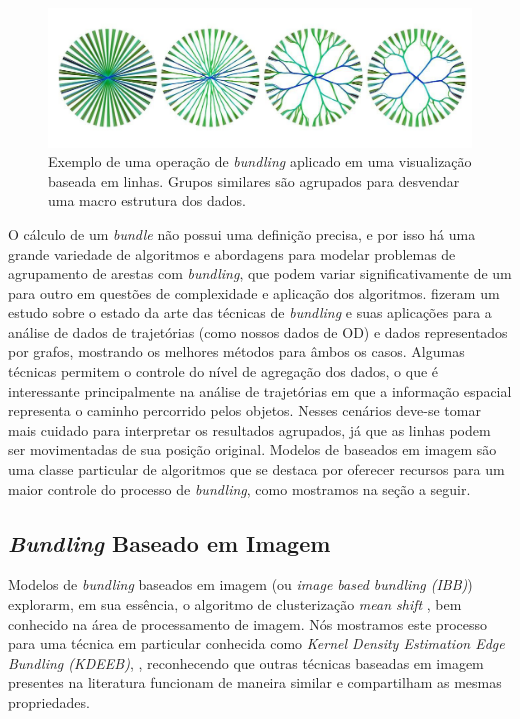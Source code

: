 \begin{figure}[!htb]
  \centering
  \includegraphics[width=1\textwidth]{../figuras/bundling.jpeg}
  \caption[Exemplo de uma operação de \emph{bundling} aplicado em uma visualização baseada em linhas]{
  Exemplo de uma operação de \emph{bundling} aplicado em uma visualização baseada em linhas. Grupos similares
  são agrupados para desvendar uma macro estrutura dos dados.}
  \label{fig:bundling-ex}
\end{figure}

O cálculo de um \emph{bundle} não possui uma definição precisa, e por isso há
uma grande variedade de algoritmos e abordagens para modelar problemas de
agrupamento de arestas com \emph{bundling}, que podem variar significativamente
de um para outro em questões de complexidade e aplicação dos algoritmos.
\citet{Lhuillier2017} fizeram um estudo sobre o estado da arte das técnicas de
\emph{bundling} e suas aplicações para a análise de dados de trajetórias (como
nossos dados de OD) e dados representados por grafos, mostrando os melhores
métodos para âmbos os casos. Algumas técnicas permitem o controle do nível de agregação dos
dados, o que é interessante principalmente na análise de trajetórias em que a
informação espacial representa o caminho percorrido pelos objetos. Nesses
cenários deve-se tomar mais cuidado para interpretar os resultados agrupados, já
que as linhas podem ser movimentadas de sua posição original. Modelos de
baseados em imagem são uma classe particular de algoritmos que se destaca por
oferecer recursos para um maior controle do processo de \emph{bundling}, como mostramos na seção
a seguir.


\subsection{\emph{Bundling} Baseado em Imagem}
\label{sec:modelo-imagem}

Modelos de \emph{bundling} baseados em imagem (ou \emph{image based bundling
(IBB)}) explorarm, em sua essência, o algoritmo de clusterização \emph{mean
shift} \citep{comaniciu02}, bem conhecido na área de processamento de imagem.
Nós mostramos este processo para uma técnica em particular conhecida como
\emph{Kernel Density Estimation Edge Bundling (KDEEB)}, \citep{hurter:12},
reconhecendo que outras técnicas baseadas em imagem presentes na literatura
funcionam de maneira similar e compartilham as mesmas propriedades.

